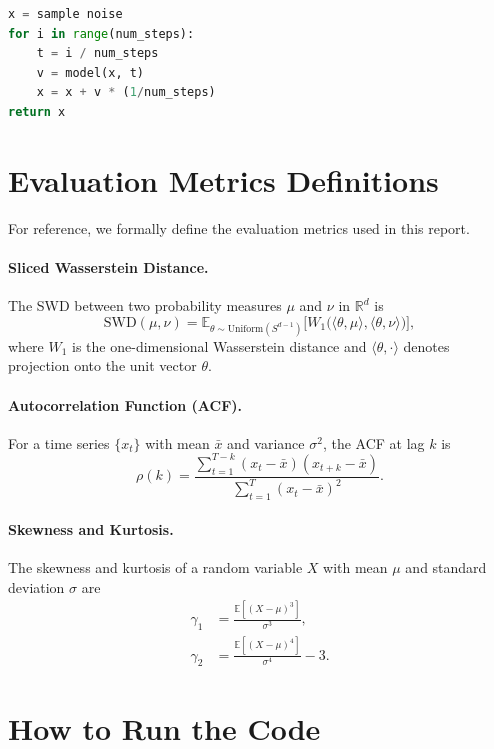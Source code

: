 \begin{lstlisting}[language=Python, caption=Flow Matching Sampling]
x = sample noise
for i in range(num_steps):
    t = i / num_steps
    v = model(x, t)
    x = x + v * (1/num_steps)
return x
\end{lstlisting}

\section{Evaluation Metrics Definitions}

For reference, we formally define the evaluation metrics used in
this report.

\paragraph{Sliced Wasserstein Distance.}  The SWD between two
probability measures $\mu$ and $\nu$ in $\mathbb{R}^d$ is
\begin{equation}
  \mathrm{SWD}(\mu,\nu) = \mathbb{E}_{\theta\sim \mathrm{Uniform}(S^{d-1})}
  \bigl[W_1\bigl(\langle \theta,\mu\rangle, \langle \theta,\nu\rangle\bigr)\bigr],
\end{equation}
where $W_1$ is the one-dimensional Wasserstein distance and
$\langle\theta,\cdot\rangle$ denotes projection onto the unit vector
$\theta$.

\paragraph{Autocorrelation Function (ACF).}  For a time series
$\{x_t\}$ with mean $\bar{x}$ and variance $\sigma^2$, the ACF at lag
$k$ is
\begin{equation}
  \rho(k) = \frac{\sum_{t=1}^{T-k} (x_t - \bar{x})(x_{t+k} - \bar{x})}{\sum_{t=1}^T (x_t - \bar{x})^2}.
\end{equation}

\paragraph{Skewness and Kurtosis.}  The skewness and kurtosis of a
random variable $X$ with mean $\mu$ and standard deviation $\sigma$ are
\begin{align}
  \gamma_1 &= \frac{\mathbb{E}[(X-\mu)^3]}{\sigma^3},\\
  \gamma_2 &= \frac{\mathbb{E}[(X-\mu)^4]}{\sigma^4} - 3.
\end{align}

\section{How to Run the Code}

